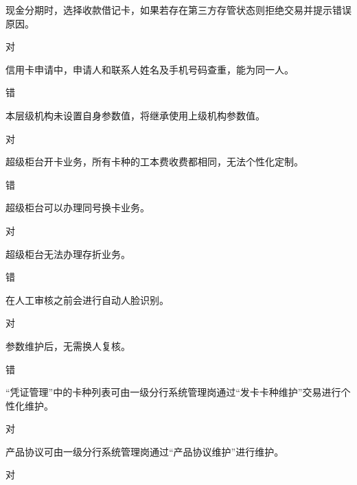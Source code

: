 \documentclass[kindlepaper]{BHCexam4kindle}
\begin{document}
\begin{questions}
\qs 现金分期时，选择收款借记卡，如果若存在第三方存管状态则拒绝交易并提示错误原因。 \xx
\begin{solution} 对 \end{solution}
\qs 信用卡申请中，申请人和联系人姓名及手机号码查重，能为同一人。 \xx
\begin{solution} 错 \end{solution}
\qs 本层级机构未设置自身参数值，将继承使用上级机构参数值。 \xx
\begin{solution} 对 \end{solution}
\qs 超级柜台开卡业务，所有卡种的工本费收费都相同，无法个性化定制。 \xx
\begin{solution} 错 \end{solution}
\qs 超级柜台可以办理同号换卡业务。 \xx
\begin{solution} 对 \end{solution}
\qs 超级柜台无法办理存折业务。 \xx
\begin{solution} 错 \end{solution}
\qs 在人工审核之前会进行自动人脸识别。 \xx
\begin{solution} 对 \end{solution}
\qs 参数维护后，无需换人复核。 \xx
\begin{solution} 错 \end{solution}
\qs “凭证管理”中的卡种列表可由一级分行系统管理岗通过“发卡卡种维护”交易进行个性化维护。 \xx
\begin{solution} 对 \end{solution}
\qs 产品协议可由一级分行系统管理岗通过“产品协议维护”进行维护。 \xx
\begin{solution} 对 \end{solution}

\end{questions}
\end{document}
